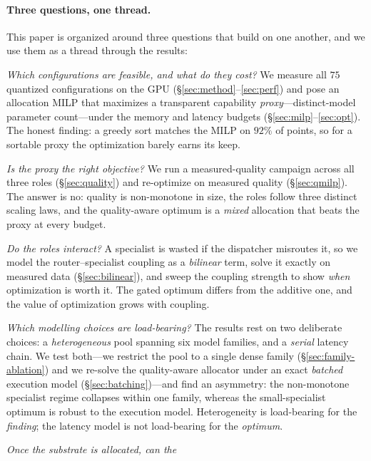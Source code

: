 \documentclass[11pt]{article}
\begin{document}
\paragraph{Three questions, one thread.} This paper is organized around three
questions that build on one another, and we use them as a thread through the
results:
\begin{description}\itemsep2pt
\item[\textbf{Q1 (Cost).}] \emph{Which configurations are feasible, and what do
they cost?} We measure all $75$ quantized configurations on the GPU
(§\ref{sec:method}--\ref{sec:perf}) and pose an allocation MILP that maximizes a
transparent capability \emph{proxy}---distinct-model parameter count---under the
memory and latency budgets (§\ref{sec:milp}--\ref{sec:opt}). The honest finding: a
greedy sort matches the MILP on $92\%$ of points, so for a sortable proxy the
optimization barely earns its keep.
\item[\textbf{Q2 (Capability).}] \emph{Is the proxy the right objective?} We run a
measured-quality campaign across all three roles (§\ref{sec:quality}) and
re-optimize on measured quality (§\ref{sec:qmilp}). The answer is no: quality is
non-monotone in size, the roles follow three distinct scaling laws, and the
quality-aware optimum is a \emph{mixed} allocation that beats the proxy at every
budget.
\item[\textbf{Q3 (Coupling).}] \emph{Do the roles interact?} A specialist is wasted
if the dispatcher misroutes it, so we model the router--specialist coupling as a
\emph{bilinear} term, solve it exactly on measured data (§\ref{sec:bilinear}), and
sweep the coupling strength to show \emph{when} optimization is worth it. The gated
optimum differs from the additive one, and the value of optimization grows with
coupling.
\item[\textbf{Q4 (Generality).}] \emph{Which modelling choices are load-bearing?}
The results rest on two deliberate choices: a \emph{heterogeneous} pool spanning
six model families, and a \emph{serial} latency chain. We test both---we
restrict the pool to a single dense family (§\ref{sec:family-ablation}) and we
re-solve the quality-aware allocator under an exact \emph{batched} execution
model (§\ref{sec:batching})---and find an asymmetry: the non-monotone
specialist regime collapses within one family, whereas the small-specialist optimum
is robust to the execution model. Heterogeneity is load-bearing for the
\emph{finding}; the latency model is not load-bearing for the \emph{optimum}.
\item[\textbf{Q5 (Adaptivity).}] \emph{Once the substrate is allocated, can the
}
\end{description}
\end{document}
